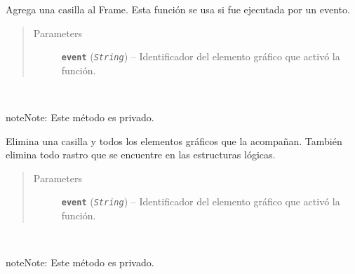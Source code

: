 \documentclass[letterpaper,10pt,english]{sphinxmanual}
\begin{document}
\begin{fulllineitems}
\begin{fulllineitems}
Agrega una casilla al Frame. Esta función se usa si 
fue ejecutada por un evento.
\begin{quote}\begin{description}
\item[{Parameters}] \leavevmode
\textbf{\texttt{event}} (\emph{\texttt{String}}) -- Identificador del elemento gráfico que activó la función.

\end{description}\end{quote}

\end{fulllineitems}


\begin{fulllineitems}
\label{View/Main/ObjectiveFunction/FunctionFrame:View.Main.ObjectiveFunction.FunctionFrame.FunctionFrame._FunctionFrame__delete_single_function}~
\begin{notice}{note}{Note:}
Este método es privado.
\end{notice}

Elimina una casilla y todos los elementos gráficos que la acompañan.
También elimina todo rastro que se encuentre en las estructuras lógicas.
\begin{quote}\begin{description}
\item[{Parameters}] \leavevmode
\textbf{\texttt{event}} (\emph{\texttt{String}}) -- Identificador del elemento gráfico que activó la función.

\end{description}\end{quote}

\end{fulllineitems}


\begin{fulllineitems}
\label{View/Main/ObjectiveFunction/FunctionFrame:View.Main.ObjectiveFunction.FunctionFrame.FunctionFrame._FunctionFrame__grid_widgets}~
\begin{notice}{note}{Note:}
Este método es privado.
\end{notice}


\end{fulllineitems}
\end{fulllineitems}
\end{document}
